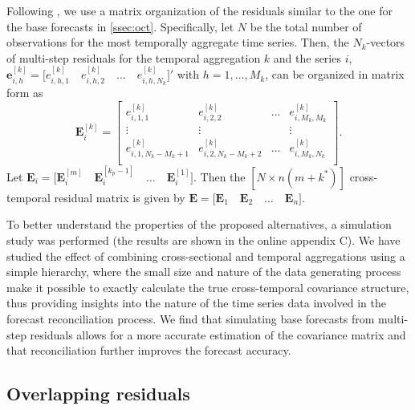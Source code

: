 \documentclass[a4paper,11pt]{article}
\newcommand{\evet}{\bm{e}}
\newcommand{\Evet}{\bm{E}}
\theoremstyle{definition}
\begin{document}
Following \cite{difonzo2023}, we use a matrix organization of the residuals similar to the one for the base forecasts in \autoref{ssec:oct}. Specifically, let $N$ be the total number of observations for the most temporally aggregate time series. Then, the $N_k$-vectors of multi-step residuals for the temporal aggregation $k$ and the series $i$, $\evet_{i,h}^{[k]} =  \Big[e_{i,h,1}^{[k]} \quad e_{i,h,2}^{[k]} \quad \dots \quad e_{i,h,N_k}^{[k]}\Big]'$ with $h = 1,\dots, M_k$, can be organized in matrix form as
$$
	\Evet_i^{[k]} = \begin{bmatrix}
		e_{i,1,1}^{[k]}                     & e_{i,2,2}^{[k]}                     & \dots & e_{i,M_k,M_k}^{[k]} \\
		\vdots                            & \vdots                            &       & \vdots                  \\
		e_{i,1,N_k - M_k + 1}^{[k]} & e_{i,2,N_k - M_k + 2}^{[k]} & \dots & e_{i,M_k,N_k}^{[k]}         \\
	\end{bmatrix}.
$$
Let $\Evet_i = \Big[\Evet_i^{[m]} \quad \Evet_i^{[k_p-1]} \quad \dots \quad \Evet_i^{[1]}  \Big]$. Then the $[N \times n(m+k^\ast)]$ cross-temporal residual matrix is given by $
	\Evet = \Big[\Evet_1 \quad \Evet_2 \quad \dots \quad \Evet_n \Big]$.

To better understand the properties of the proposed alternatives, a simulation study was performed (the results are shown in the online appendix C). We have studied the effect of combining cross-sectional and temporal aggregations using a simple hierarchy, where the small size and nature of the data generating process make it possible to exactly calculate the true cross-temporal covariance structure, thus providing insights into the nature of the time series data involved in the forecast reconciliation process. We find that simulating base forecasts from multi-step residuals allows for a more accurate estimation of the covariance matrix and that reconciliation further improves the forecast accuracy. %

\subsection{Overlapping residuals}\label{ssec:over_res}
\end{document}
